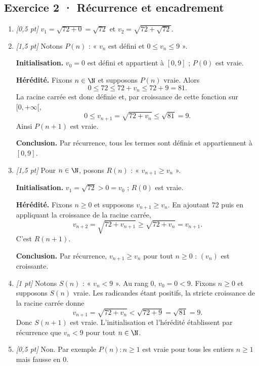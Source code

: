 \subsection*{Exercice 2 · Récurrence et encadrement}\begin{enumerate}

\item \textit{[0,5 pt]} $v_1=\sqrt{72+0}=\sqrt{72}$ et $v_2=\sqrt{72+\sqrt{72}}$.

\item \textit{[1,5 pt]} Notons $P(n)$ : « $v_n$ est défini et $0\le v_n\le 9$ ».
\par\smallskip\textbf{Initialisation.} $v_0=0$ est défini et appartient à $[0,9]$ ; $P(0)$ est vraie.
\par\smallskip\textbf{Hérédité.} Fixons $n\in\N$ et supposons $P(n)$ vraie. Alors
\[0\le 72\le 72+v_n\le 72+9=81.\]
La racine carrée est donc définie et, par croissance de cette fonction sur $[0,+\infty[$,
\[0\le v_{n+1}=\sqrt{72+v_n}\le\sqrt{81}=9.\]
Ainsi $P(n+1)$ est vraie.
\par\smallskip\textbf{Conclusion.} Par récurrence, tous les termes sont définis et appartiennent à $[0,9]$.

\item \textit{[1,5 pt]} Pour $n\in\N$, posons $R(n)$ : « $v_{n+1}\ge v_n$ ».
\par\smallskip\textbf{Initialisation.} $v_1=\sqrt{72}>0=v_0$ ; $R(0)$ est vraie.
\par\smallskip\textbf{Hérédité.} Fixons $n\ge0$ et supposons $v_{n+1}\ge v_n$. En ajoutant $72$ puis en appliquant la croissance de la racine carrée,
\[v_{n+2}=\sqrt{72+v_{n+1}}\ge\sqrt{72+v_n}=v_{n+1}.\]
C'est $R(n+1)$.
\par\smallskip\textbf{Conclusion.} Par récurrence, $v_{n+1}\ge v_n$ pour tout $n\ge0$ : $(v_n)$ est croissante.

\item \textit{[1 pt]} Notons $S(n)$ : « $v_n<9$ ». Au rang $0$, $v_0=0<9$.
Fixons $n\ge0$ et supposons $S(n)$ vraie. Les radicandes étant positifs, la stricte croissance de la racine carrée donne
\[v_{n+1}=\sqrt{72+v_n}<\sqrt{72+9}=\sqrt{81}=9.\]
Donc $S(n+1)$ est vraie. L'initialisation et l'hérédité établissent par récurrence que $v_n<9$ pour tout $n\in\N$.

\item \textit{[0,5 pt]} Non. Par exemple $P(n):n\ge1$ est vraie pour tous les entiers $n\ge1$ mais fausse en $0$.

\end{enumerate}

